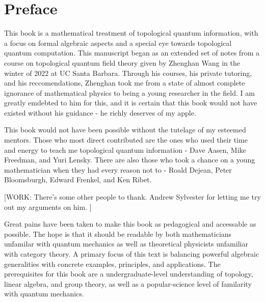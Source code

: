 \section{Preface}
\label{Preface}

This book is a mathematical treatment of topological quantum information, with a focus on formal algebraic aspects and a special eye towards topological quantum computation. This manuscript began as an extended set of notes from a course on topological quantum field theory given by Zhenghan Wang in the winter of 2022 at UC Santa Barbara. Through his courses, his private tutoring, and his reccomendations, Zhenghan took me from a state of almost complete ignorance of mathematical physics to being a young researcher in the field. I am greatly emdebted to him for this, and it is certain that this book would not have existed without his guidance - he richly deserves of my apple.

This book would not have been possible without the tutelage of my esteemed mentors. Those who most direct contributed are the ones who used their time and energy to teach me topological quantum information - Dave Aasen, Mike Freedman, and Yuri Lensky. There are also those who took a chance on a young mathematician when they had every reason not to - Roald Dejean, Peter Bloomsburgh, Edward Frenkel, and Ken Ribet.

[WORK: There's some other people to thank. Andrew Sylvester for letting me try out my arguments on him. ]

Great pains have been taken to make this book as pedagogical and accessable as possible. The hope is that it should be readable by both mathematicians unfamilar with quantum mechanics as well as theoretical physicists unfamiliar with category theory. A primary focus of this text is balancing powerful algebraic generalities with concrete examples, principles, and applications. The prerequisites for this book are a undergraduate-level understanding of topology, linear algebra, and group theory, as well as a popular-science level of familarity with quantum mechanics.

